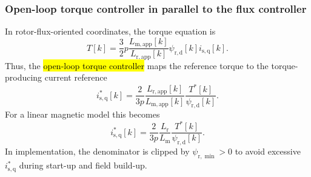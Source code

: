 \begin{frame}
    \frametitle{Open-loop torque controller in parallel to the flux controller}
    In rotor-flux-oriented coordinates, the torque equation is
    \begin{equation}
        T[k]
        =\frac{3}{2}p\frac{L_{\mathrm{m},\mathrm{app}}[k]}{L_{\mathrm{r},\mathrm{app}}[k]}
        \psi_{\mathrm{r,d}}[k]i_{\mathrm{s,q}}[k] .
        \label{eq:IM_flux_torque_equation}
    \end{equation}\pause%
    Thus, the \hl{open-loop torque controller} maps the reference torque to the torque-producing current reference
    \begin{equation}
        i^{*}_{\mathrm{s,q}}[k]
        =\frac{2}{3p}\frac{L_{\mathrm{r},\mathrm{app}}[k]}{L_{\mathrm{m},\mathrm{app}}[k]}
        \frac{T^*[k]}{\psi_{\mathrm{r,d}}[k]} .
        \label{eq:IM_flux_torque_to_isq}
    \end{equation}\pause%
    For a linear magnetic model this becomes
    \begin{equation}
        i^{*}_{\mathrm{s,q}}[k]
        =\frac{2}{3p}\frac{L_\mathrm{r}}{L_\mathrm{m}}
        \frac{T^*[k]}{\psi_{\mathrm{r,d}}[k]} .
    \end{equation}\pause%
    In implementation, the denominator is clipped by $\psi_{\mathrm{r},\min}>0$ to avoid excessive $i^{*}_{\mathrm{s,q}}$ during start-up and field build-up.
\end{frame}

